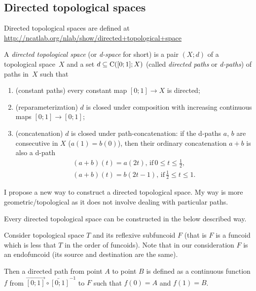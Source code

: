 \subsection{Directed topological spaces}

Directed topological spaces are defined at\\
\url{http://ncatlab.org/nlab/show/directed+topological+space}

\begin{defn}
A \emph{directed topological space} (or \emph{d-space} for short) is a pair $(X;d)$ of a topological space~$X$ and
a set $d\subseteq\mathrm{C}([0;1];X)$ (called \emph{directed paths} or \emph{d-paths}) of paths in~$X$ such that
\begin{enumerate}
\item (constant paths) every constant map $[0;1]\to X$ is directed;
\item (reparameterization) $d$ is closed under composition with increasing continuous maps $[0;1]\to [0;1]$;
\item (concatenation) $d$ is closed under path-concatenation: if the d-paths $a$, $b$ are consecutive in $X$ ($a(1)=b(0)$), then their ordinary concatenation $a+b$ is also a d-path
\begin{gather*}
(a+b)(t) = a(2t),\,\text{if}\, 0\le t\le \frac{1}{2}, \\
(a+b)(t) = b(2t-1),\,\text{if}\, \frac{1}{2}\le t\le 1.
\end{gather*}
\end{enumerate}
\end{defn}

I propose a new way to construct a directed topological space. My way is more geometric/topological as it does not involve dealing with particular paths.

\begin{conjecture}
Every directed topological space can be constructed in the below described way.
\end{conjecture}

Consider topological space $T$ and its reflexive subfuncoid $F$ (that is $F$ is a funcoid which is less that $T$ in the order of funcoids).
Note that in our consideration $F$ is an endofuncoid (its source and destination are the same).

Then a directed path from point $A$ to point $B$ is defined as a continuous function $f$ from
$\overrightarrow{[0;1]}\circ\overleftarrow{[0;1]}^{-1}$ to $F$ such that $f(0)=A$ and $f(1)=B$.

